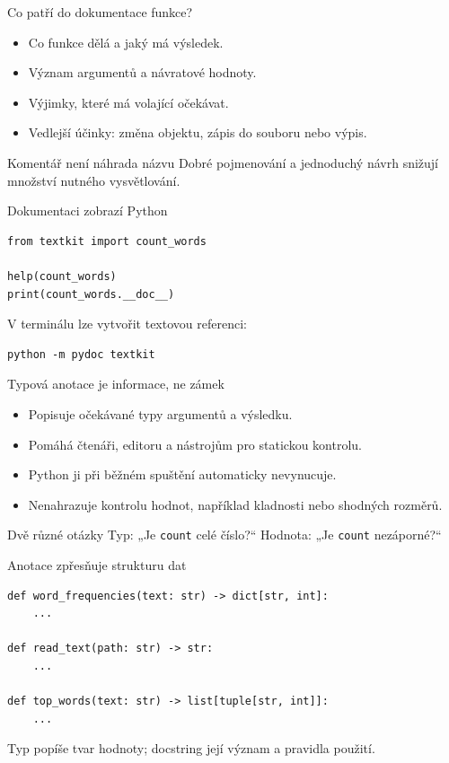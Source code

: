 \documentclass[aspectratio=169]{beamer}
\begin{document}
\begin{frame}{Co patří do dokumentace funkce?}
  \begin{itemize}
    \item Co funkce dělá a jaký má výsledek.
    \item Význam argumentů a návratové hodnoty.
    \item Výjimky, které má volající očekávat.
    \item Vedlejší účinky: změna objektu, zápis do souboru nebo výpis.
  \end{itemize}
  \begin{block}{Komentář není náhrada názvu}
    Dobré pojmenování a jednoduchý návrh snižují množství nutného vysvětlování.
  \end{block}
\end{frame}

\begin{frame}[fragile]{Dokumentaci zobrazí Python}
\begin{lstlisting}[style=python]
from textkit import count_words

help(count_words)
print(count_words.__doc__)
\end{lstlisting}
  V terminálu lze vytvořit textovou referenci:
\begin{lstlisting}[basicstyle=\ttfamily\large,columns=fullflexible]
python -m pydoc textkit
\end{lstlisting}
\end{frame}

\begin{frame}{Typová anotace je informace, ne zámek}
  \begin{itemize}
    \item Popisuje očekávané typy argumentů a výsledku.
    \item Pomáhá čtenáři, editoru a nástrojům pro statickou kontrolu.
    \item Python ji při běžném spuštění automaticky nevynucuje.
    \item Nenahrazuje kontrolu hodnot, například kladnosti nebo shodných rozměrů.
  \end{itemize}
  \begin{block}{Dvě různé otázky}
    Typ: „Je \texttt{count} celé číslo?“ Hodnota: „Je \texttt{count} nezáporné?“
  \end{block}
\end{frame}

\begin{frame}[fragile]{Anotace zpřesňuje strukturu dat}
\begin{lstlisting}[style=python]
def word_frequencies(text: str) -> dict[str, int]:
    ...

def read_text(path: str) -> str:
    ...

def top_words(text: str) -> list[tuple[str, int]]:
    ...
\end{lstlisting}
  Typ popíše tvar hodnoty; docstring její význam a pravidla použití.
\end{frame}
\end{document}
